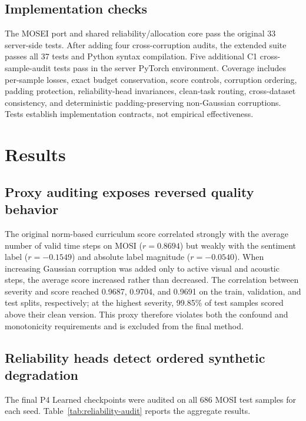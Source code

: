 \subsection{Implementation checks}\label{implementation-checks}

The MOSEI port and shared reliability/allocation core pass the original 33
server-side tests. After adding four cross-corruption audits, the extended
suite passes all 37 tests and Python syntax compilation. Five additional C1
cross-sample-audit tests pass in the server PyTorch environment. Coverage
includes per-sample losses, exact budget conservation, score controls, corruption
ordering, padding protection, reliability-head invariances, clean-task
routing, cross-dataset consistency, and deterministic padding-preserving
non-Gaussian corruptions. Tests establish implementation contracts, not
empirical effectiveness.

\section{Results}\label{results}

\subsection{Proxy auditing exposes reversed quality
behavior}\label{proxy-auditing-exposes-reversed-quality-behavior}

The original norm-based curriculum score correlated strongly with the
average number of valid time steps on MOSI (\(r=0.8694\)) but weakly
with the sentiment label (\(r=-0.1549\)) and absolute label magnitude
(\(r=-0.0540\)). When increasing Gaussian corruption was added only to
active visual and acoustic steps, the average score increased rather
than decreased. The correlation between severity and score reached
0.9687, 0.9704, and 0.9691 on the train, validation, and test splits,
respectively; at the highest severity, 99.85\% of test samples scored
above their clean version. This proxy therefore violates both the
confound and monotonicity requirements and is excluded from the final
method.

\subsection{Reliability heads detect ordered synthetic
degradation}\label{reliability-heads-detect-ordered-synthetic-degradation}

The final P4 Learned checkpoints were audited on all 686 MOSI test
samples for each seed. Table~\ref{tab:reliability-audit} reports the
aggregate results.

